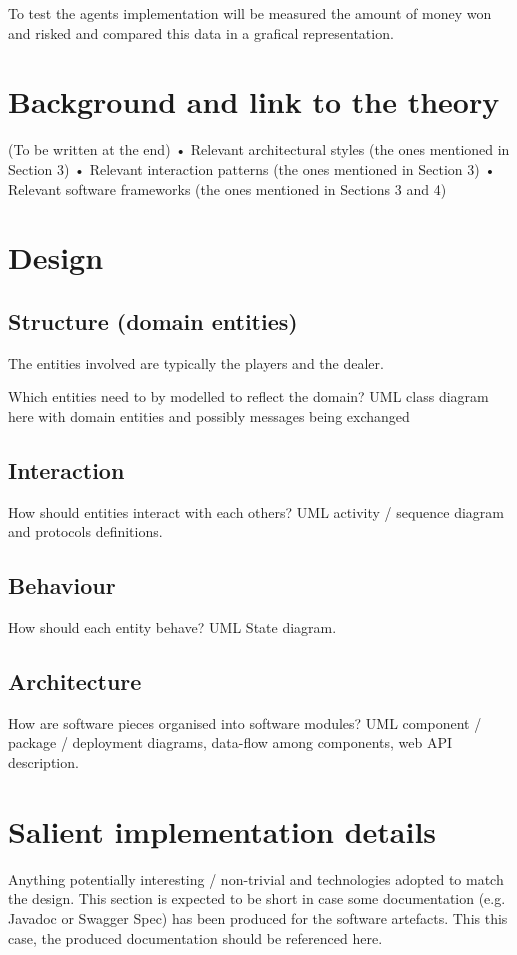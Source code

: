 To test the agents implementation will be measured the amount of money won and risked and compared this data in a grafical representation.

\chapter{Background and link to the theory}

(To be written at the end)
• Relevant architectural styles (the ones mentioned in Section 3)
• Relevant interaction patterns (the ones mentioned in Section 3)
• Relevant software frameworks (the ones mentioned in Sections 3 and 4)

\chapter{Design}


\section{Structure (domain entities)}
The entities involved are typically the players and the dealer.




Which entities need to by modelled to reflect the domain? UML class diagram here with
domain entities and possibly messages being exchanged

\section{Interaction}
How should entities interact with each others? UML activity / sequence diagram and
protocols definitions.

\section{Behaviour}
How should each entity behave? UML State diagram.

\section{Architecture}
How are software pieces organised into software modules? UML component / package /
deployment diagrams, data-flow among components, web API description.


\chapter{Salient implementation details}
Anything potentially interesting / non-trivial and technologies adopted to match the
design. This section is expected to be short in case some documentation (e.g. Javadoc
or Swagger Spec) has been produced for the software artefacts. This this case, the
produced documentation should be referenced here.

